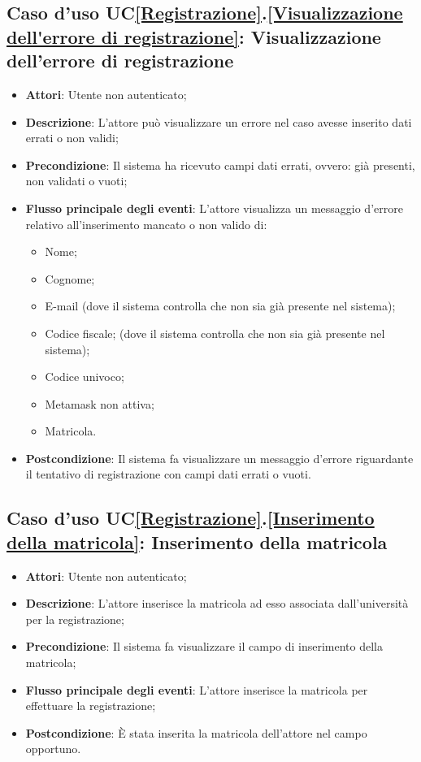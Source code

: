 \subsection{Caso d'uso UC\ref{Registrazione}.\ref{Visualizzazione dell'errore di registrazione}: Visualizzazione dell'errore di registrazione}
\begin{itemize}
	\item \textbf{Attori}: Utente non autenticato;
	\item \textbf{Descrizione}: L'attore può visualizzare un errore nel caso avesse inserito dati errati o non validi;
	\item \textbf{Precondizione}: Il sistema ha ricevuto campi dati errati, ovvero: già presenti, non validati o vuoti;
	\item \textbf{Flusso principale degli eventi}: L'attore visualizza un messaggio d'errore relativo all'inserimento mancato o non valido di:
	\begin{itemize}
		\item Nome;
		\item Cognome;
		\item E-mail (dove il sistema controlla che non sia già presente nel sistema);
		\item Codice fiscale; (dove il sistema controlla che non sia già presente nel sistema);
		\item Codice univoco;
		\item Metamask non attiva;
		\item Matricola.
	\end{itemize}
	\item \textbf{Postcondizione}: Il sistema fa visualizzare un messaggio d'errore riguardante il tentativo di registrazione con campi dati errati o vuoti.
\end{itemize}

\subsection{Caso d'uso UC\ref{Registrazione}.\ref{Inserimento della matricola}: Inserimento della matricola}
\begin{itemize}
	\item \textbf{Attori}: Utente non autenticato;
	\item \textbf{Descrizione}: L'attore inserisce la matricola ad esso associata dall'università per la registrazione;
	\item \textbf{Precondizione}: Il sistema fa visualizzare il campo di inserimento della matricola;
	\item \textbf{Flusso principale degli eventi}: L'attore inserisce la matricola per effettuare la registrazione;
	\item \textbf{Postcondizione}: È stata inserita la matricola dell'attore nel campo opportuno.
\end{itemize}

